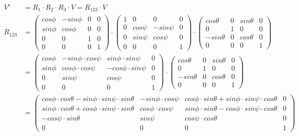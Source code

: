 \begin{align*}
V' &= R_1\cdot R_2\cdot R_3\cdot V = R_{123} \cdot V \\
R_{123} &= 
\begin{pmatrix}
cos\phi & -sin\phi & 0 & 0 \\
sin\phi & cos\phi & 0 & 0 \\
0 & 0 & 1 & 0 \\
0 & 0 & 0 & 1 
\end{pmatrix}
\cdot
\begin{pmatrix}
1 & 0 & 0 & 0 \\
0 & cos\psi & -sin\psi & 0 \\
0 & sin\psi & cos\psi & 0 \\
0 & 0 & 0 & 1 
\end{pmatrix} 
\cdot
\begin{pmatrix}
cos\theta & 0 & sin\theta & 0 \\
0 & 1 & 0 & 0 \\
-sin\theta & 0 & cos\theta & 0 \\
0 & 0 & 0 & 1 
\end{pmatrix}\\
 &=
\begin{pmatrix}
cos\phi & -sin\phi\cdot cos\psi & sin\phi\cdot sin\psi & 0 \\
sin\phi & cos\phi\cdot cos\psi & -cos\phi\cdot sin\psi & 0 \\
0 & sin\psi & cos\psi  & 0 \\
0 & 0 & 0 & 1  
\end{pmatrix}
\cdot
\begin{pmatrix}
cos\theta & 0 & sin\theta & 0 \\
0 & 1 & 0 & 0 \\
-sin\theta & 0 & cos\theta & 0 \\
0 & 0 & 0 & 1 
\end{pmatrix}\\
 &=
 \begin{pmatrix}
 cos\phi\cdot cos\theta-sin\phi\cdot sin\psi \cdot sin\theta & -sin\phi\cdot cos\psi & cos\phi \cdot sin\theta + sin\phi\cdot sin\psi \cdot cos\theta & 0 \\
 sin\phi \cdot cos\theta+cos\phi\cdot sin\psi\cdot sin\theta & cos\phi\cdot cos\psi &  sin\phi \cdot sin\theta -cos\phi\cdot sin\psi \cdot cos\theta & 0 \\
 -cos\psi \cdot sin\theta & sin\psi & cos\psi \cdot cos\theta  & 0 \\
 0 & 0 & 0 & 1  
 \end{pmatrix}\\

\end{align*}
